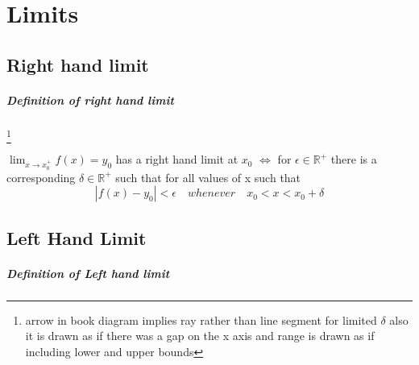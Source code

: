 \documentclass[12pt, a4paper,oneside]{book}
\begin{document}
\chapter{Limits}
\section{Right hand limit}
\paragraph{Definition of right hand limit}\footnote{arrow in book diagram implies ray rather than line segment for limited \( \delta\) also it is drawn as if there was a gap on the x axis and range is drawn as if including lower and upper bounds}

\( \lim_{x \to x_0^+}f(x) = y_0 \) has a right hand limit at \(x_0\) \(\Leftrightarrow\) for \( \epsilon \in \mathbb{R^+} \) there is a corresponding \( \delta \in \mathbb{R^+} \) such that for all values of x  such that \[|f(x) - y_0| <\epsilon \quad whenever \quad x_0 < x < x_0+\delta\]


\section{Left Hand Limit}
\paragraph{Definition of Left hand limit}
\end{document}
